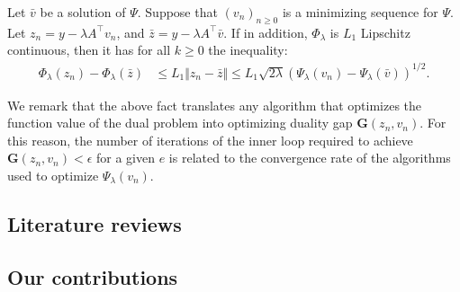\documentclass[12pt]{article}
\begin{document}
        \begin{fact}\label{fact:minimizing-dual-pp}
            Let $\bar v$ be a solution of $\Psi$. 
            Suppose that $(v_n)_{n \ge 0}$ is a minimizing sequence for $\Psi$. 
            Let $z_n = y - \lambda A^\top v_n$, and $\bar z = y - \lambda A^\top \bar v$. 
            If in addition, $\Phi_\lambda$ is $L_1$ Lipschitz continuous, then it has for all $k \ge 0$ the inequality: 
            \begin{align*}
                \Phi_{\lambda}(z_n) - \Phi_\lambda(\bar z) 
                &\le L_1 \Vert z_n - \bar z\Vert 
                \le L_1\sqrt{2\lambda}(\Psi_\lambda(v_n) - \Psi_\lambda(\bar v))^{1/2}. 
            \end{align*}
        \end{fact}
        We remark that the above fact translates any algorithm that optimizes the function value of the dual problem into optimizing duality gap $\mathbf G(z_n, v_n)$. 
        For this reason, the number of iterations of the inner loop required to achieve $\mathbf G(z_n, v_n) < \epsilon$ for a given $e$ is related to the convergence rate of the algorithms used to optimize $\Psi_\lambda(v_n)$. 
    \subsection{Literature reviews}

    \subsection{Our contributions}
\end{document}
